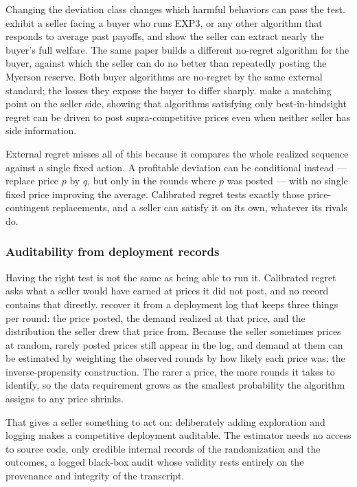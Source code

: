 Changing the deviation class changes which harmful behaviors can pass the test.
\citet{Braverman2018} exhibit a seller facing a buyer who runs EXP3, or any other
algorithm that responds to average past payoffs, and show the seller can extract
nearly the buyer's full welfare. The same paper builds a different no-regret algorithm
for the buyer, against which the seller can do no better than repeatedly posting the
Myerson reserve. Both buyer algorithms are no-regret by the same external standard;
the losses they expose the buyer to differ sharply.
\citet{HartlineWangZhang2025} make a matching point on the seller side, showing that
algorithms satisfying only best-in-hindsight regret can be driven to post
supra-competitive prices even when neither seller has side information.

External regret misses all of this because it compares the whole realized sequence
against a single fixed action. A profitable deviation can be conditional instead ---
replace price $p$ by $q$, but only in the rounds where $p$ was posted --- with no
single fixed price improving the average. Calibrated regret tests exactly those
price-contingent replacements, and a seller can satisfy it on its own, whatever its
rivals do.

\subsubsection{Auditability from deployment records}
Having the right test is not the same as being able to run it. Calibrated regret asks
what a seller would have earned at prices it did not post, and no record contains that
directly. \citet{HartlineLongZhang2024} recover it from a deployment log that keeps
three things per round: the price posted, the demand realized at that price, and the
distribution the seller drew that price from. Because the seller sometimes prices at
random, rarely posted prices still appear in the log, and demand at them can be
estimated by weighting the observed rounds by how likely each price was: the
inverse-propensity construction. The rarer a price, the more rounds it takes
to identify, so the data requirement grows as the smallest probability the algorithm assigns
to any price shrinks.

That gives a seller something to act on: deliberately adding exploration and logging
makes a competitive deployment auditable. The estimator needs no access to source
code, only credible internal records of the randomization and the outcomes, a logged
black-box audit whose validity rests entirely on the provenance and integrity
of the transcript.

